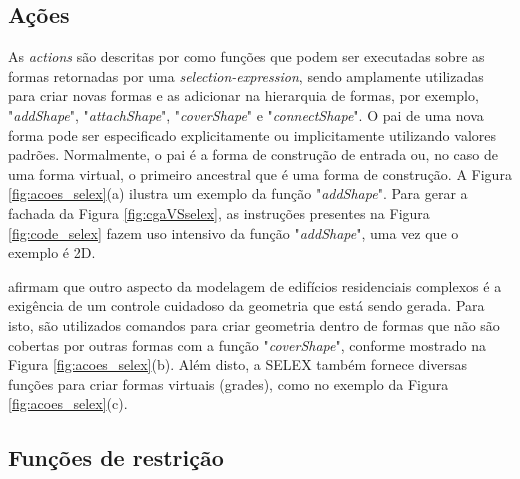 \subsection{Ações}
\label{sec:selex_acoes}

As \textit{actions} são descritas por  como funções que podem ser executadas sobre as formas retornadas por uma \textit{selection-expression}, sendo amplamente utilizadas para criar novas formas e as adicionar na hierarquia de formas, por exemplo, "\textit{addShape}", "\textit{attachShape}", "\textit{coverShape}" e "\textit{connectShape}". O pai de uma nova forma pode ser especificado explicitamente ou implicitamente utilizando valores padrões. Normalmente, o pai é a forma de construção de entrada ou, no caso de uma forma virtual, o primeiro ancestral que é uma forma de construção. A Figura \ref{fig:acoes_selex}(a) ilustra um exemplo da função "\textit{addShape}". Para gerar a fachada da Figura \ref{fig:cgaVSselex}, as instruções presentes na Figura \ref{fig:code_selex} fazem uso intensivo da função "\textit{addShape}", uma vez que o exemplo é 2D.

 afirmam que outro aspecto da modelagem de edifícios residenciais complexos é a exigência de um controle cuidadoso da geometria que está sendo gerada. Para isto, são utilizados comandos para criar geometria dentro de formas que não são cobertas por outras formas com a função "\textit{coverShape}", conforme mostrado na Figura \ref{fig:acoes_selex}(b). Além disto, a \gls{SELEX} também fornece diversas funções para criar formas virtuais (grades), como no exemplo da Figura \ref{fig:acoes_selex}(c).

\begin{figure}[h!]
	\centering
	\captionsetup{width=15cm}
	{}	
\end{figure}

\subsection{Funções de restrição}
\label{sec:selex_funcoes}

